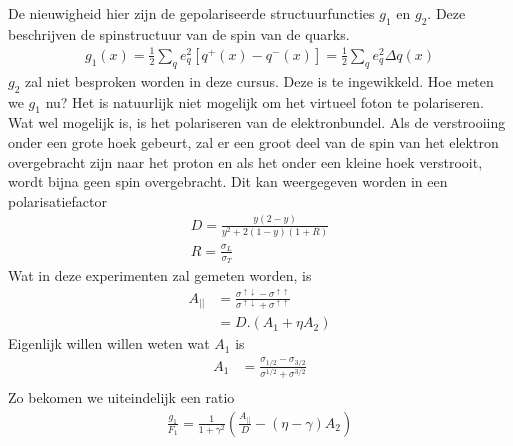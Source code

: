 \documentclass[../main.tex]{subfiles}
\begin{document}
De nieuwigheid hier zijn de gepolariseerde structuurfuncties $g_1$ en $g_2$. Deze beschrijven de spinstructuur van de spin van de quarks.
\begin{equation}
    \begin{aligned}
        \label{eq:g_1_pol}
        g_1(x)=\frac{1}{2} \sum_q e_q^2[q^+(x)-q^-(x)] = \frac{1}{2} \sum_q e_q^2 \Delta q(x)
    \end{aligned}
\end{equation}
$g_2$ zal niet besproken worden in deze cursus. Deze is te ingewikkeld. Hoe meten we $g_1$ nu? Het is natuurlijk niet mogelijk om het virtueel foton te polariseren. Wat wel mogelijk is, is het polariseren van de elektronbundel. Als de verstrooiing onder een grote hoek gebeurt, zal er een groot deel van de spin van het elektron overgebracht zijn naar het proton en als het onder een kleine hoek verstrooit, wordt bijna geen spin overgebracht. Dit kan weergegeven worden in een polarisatiefactor
\begin{equation}
    \begin{aligned}
        \label{eq:pol_factor}
        D= \frac{y(2-y)}{y^2 + 2(1-y)(1+R)}\\
        R= \frac{\sigma_L}{\sigma_T} 
    \end{aligned}
\end{equation}
Wat in deze experimenten zal gemeten worden, is
\begin{equation}
    \begin{aligned}
        \label{eq:a_parallel}
        A_{||} &= \frac{\sigma^{\uparrow\downarrow} - \sigma^{\uparrow\uparrow}}{\sigma^{\uparrow\downarrow} + \sigma^{\uparrow\uparrow}}\\
               &= D.(A_1+\eta A_2)
    \end{aligned}
\end{equation}
Eigenlijk willen willen weten wat $A_1$ is
\begin{equation}
    \begin{aligned}
        \label{eq:a_parallel}
        A_{1} &= \frac{\sigma_{1/2} - \sigma_{3/2}}{\sigma^{1/2} + \sigma^{3/2}}\\
    \end{aligned}
\end{equation}
Zo bekomen we uiteindelijk een ratio
\begin{equation}
    \begin{aligned}
        \label{eq:pol_ratio_struct_func}
        \frac{g_1}{F_1} = \frac{1}{1+\gamma^2} \left( \frac{A_{||}}{D} - (\eta - \gamma)A_2\right)
    \end{aligned}
\end{equation}
\end{document}
